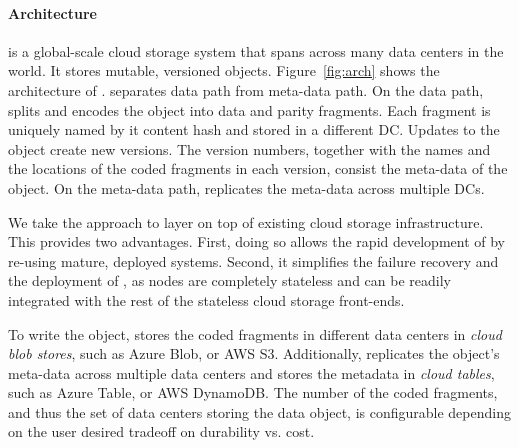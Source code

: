 \paragraph{Architecture}
{\name} is a global-scale cloud storage system 
that spans across many data centers in the world.
It stores mutable, versioned objects.
Figure~\ref{fig:arch} shows the architecture of \name. 
\name separates data path from meta-data path.
On the data path, \name splits and encodes the object into data and parity fragments.
Each fragment is uniquely named by it content hash
and stored in a different DC.
Updates to the object create new versions.
The version numbers, together with the names and the locations of the coded fragments in each version,
consist the meta-data of the object.
On the meta-data path, \name replicates the meta-data across multiple DCs.

We take the approach to layer \name on top of existing cloud storage infrastructure. This 
provides two advantages.  First, doing so allows the rapid development of \name by re-using 
mature, deployed systems.  Second, it simplifies the failure recovery and 
the deployment of \name, as \name nodes are completely stateless and can be
readily integrated with the rest of the stateless cloud storage front-ends.

To write the object,
{\name} stores the coded fragments in different data centers in {\em cloud blob stores},
such as Azure Blob, or AWS S3.
Additionally, \name replicates the object's meta-data across multiple data centers 
and stores the metadata in {\em cloud tables}, such as Azure Table, or AWS DynamoDB. 
The number of the coded fragments, and thus the set of data centers
storing the data object, is configurable depending on the user desired tradeoff on
durability vs. cost.

%


